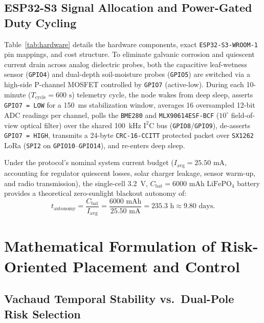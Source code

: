 \documentclass[10pt,twocolumn,a4paper]{article}
\begin{document}
\subsection{ESP32-S3 Signal Allocation and Power-Gated Duty Cycling}

Table~\ref{tab:hardware} details the hardware components, exact \texttt{ESP32-S3-WROOM-1} pin mappings, and cost structure. To eliminate galvanic corrosion and quiescent current drain across analog dielectric probes, both the capacitive leaf-wetness sensor (\texttt{GPIO4}) and dual-depth soil-moisture probes (\texttt{GPIO5}) are switched via a high-side P-channel MOSFET controlled by \texttt{GPIO7} (active-low). During each 10-minute ($T_{\text{cycle}} = 600\text{ s}$) telemetry cycle, the node wakes from deep sleep, asserts \texttt{GPIO7 = LOW} for a 150~ms stabilization window, averages 16 oversampled 12-bit ADC readings per channel, polls the \texttt{BME280} and \texttt{MLX90614ESF-BCF} ($10^\circ$ field-of-view optical filter) over the shared 100~kHz $\mathrm{I^2C}$ bus (\texttt{GPIO8}/\texttt{GPIO9}), de-asserts \texttt{GPIO7 = HIGH}, transmits a 24-byte \texttt{CRC-16-CCITT} protected packet over \texttt{SX1262} LoRa (\texttt{SPI2} on \texttt{GPIO10}--\texttt{GPIO14}), and re-enters deep sleep.

Under the protocol's nominal system current budget ($I_{\text{avg}} = 25.50\text{ mA}$, accounting for regulator quiescent losses, solar charger leakage, sensor warm-up, and radio transmission), the single-cell 3.2~V, $C_{\text{bat}} = 6000\text{ mAh}$ $\mathrm{LiFePO_4}$ battery provides a theoretical zero-sunlight blackout autonomy of:
\begin{equation}
  t_{\text{autonomy}} = \frac{C_{\text{bat}}}{I_{\text{avg}}} = \frac{6000\text{ mAh}}{25.50\text{ mA}} = 235.3\text{ h} \approx 9.80\text{ days.}
  \label{eq:autonomy}
\end{equation}

\section{Mathematical Formulation of Risk-Oriented Placement and Control}

\subsection{Vachaud Temporal Stability vs.\ Dual-Pole Risk Selection}
\end{document}
